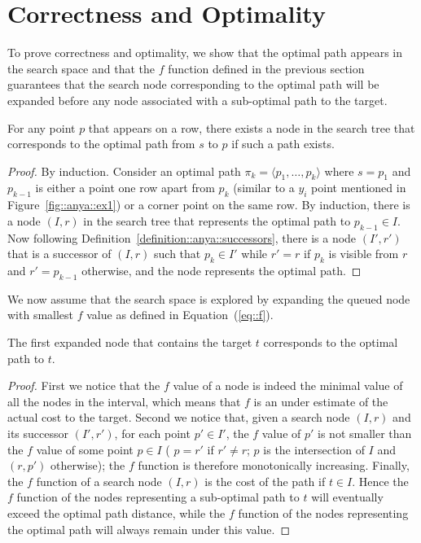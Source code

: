 \section{Correctness and Optimality}

To prove correctness and optimality, 
we show that the optimal path 
appears in the search space 
and that the $f$ function defined in the previous section 
guarantees that the search node 
corresponding to the optimal path 
will be expanded before any node 
associated with a sub-optimal path to the target.  

\begin{theorem}
  For any point $p$ that appears on a row, 
  there exists a node in the search tree 
  that corresponds to the optimal path from $s$ to $p$ 
  if such a path exists.  
\end{theorem}

\begin{proof}
  By induction.  
  Consider an optimal path 
  $\pi_k = \langle p_1,\dots,p_k\rangle$ 
  where $s = p_1$ and $p_{k-1}$ is either a point 
  one row apart from $p_k$ (similar to a $y_i$ point
  mentioned in Figure~\ref{fig::anya::ex1}) or a corner point on the same row.  
  By induction, there is a node $(I,r)$ in the search tree 
  that represents the optimal path to $p_{k-1} \in I$.  
  Now following Definition~\ref{definition::anya::successors}, 
  there is a node $(I',r')$ 
  that is a successor of $(I,r)$ 
  such that $p_k \in I'$ while $r' = r$ if $p_k$ is visible from $r$ 
  and $r' = p_{k-1}$ otherwise, and the node represents the optimal path.  
\end{proof}

We now assume that the search space is explored 
by expanding the queued node with smallest $f$ value 
as defined in Equation~(\ref{eq::f}).  

\begin{theorem}
  The first expanded node 
  that contains the target $t$ 
  corresponds to the optimal path to $t$.  
\end{theorem}

\begin{proof}
  First we notice that the $f$ value of a node 
  is indeed the minimal value of all the nodes in the interval, 
  which means that $f$ is an under estimate of the actual cost 
  to the target.  
  Second we notice that, given a search node $(I,r)$ 
  and its successor $(I',r')$, 
  for each point $p' \in I'$, 
  the $f$ value of $p'$ is not smaller 
  than the $f$ value of some point $p \in I$ 
  (%
  $p = r'$ if $r' \neq r$; 
  $p$ is the intersection of $I$ and $(r,p')$ otherwise); 
  the $f$ function is therefore monotonically increasing.  
  Finally, the $f$ function of a search node $(I,r)$ 
  is the cost of the path if $t \in I$.  
  Hence the $f$ function of the nodes representing 
  a sub-optimal path to $t$ 
  will eventually exceed the optimal path distance, 
  while the $f$ function of the nodes representing the optimal path 
  will always remain under this value.  
\end{proof}

